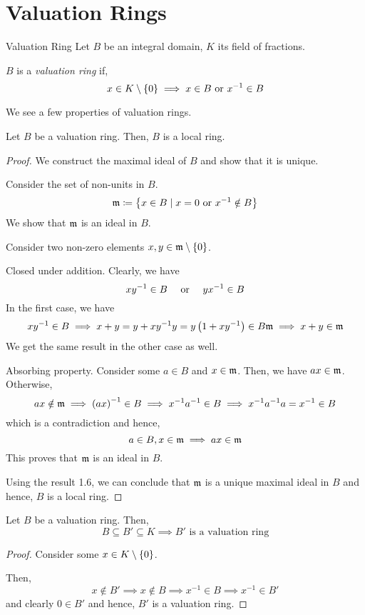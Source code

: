 \pagebreak

\section{Valuation Rings}
\begin{definition}{Valuation Ring}{}
	Let \(B\) be an integral domain, \(K\) its field of fractions.

	\(B\) is a \emph{valuation ring} if,
	\[
		x \in K \setminus \left\{ 0 \right\}
		\implies x \in B \text{ or } x^{-1} \in B
	\]
\end{definition}

We see a few properties of valuation rings.

\begin{proposition}{}{}
\label{prop:5.18.1}
	Let \(B\) be a valuation ring.
	Then, \(B\) is a local ring.
\end{proposition}
\begin{proof}
	We construct the maximal ideal of \(B\) and show that it is unique.

	Consider the set of non-units in \(B\).
	\[
		\mathfrak{m} \coloneqq \left\{ x \in B \mid x = 0 \text{ or } x^{-1} \notin B \right\}
	\]
	We show that \(\mathfrak{m}\) is an ideal in \(B\).

	Consider two non-zero elements \(x, y \in \mathfrak{m} \setminus \left\{ 0 \right\}\).

	Closed under addition.
	Clearly, we have
	\[
		xy^{-1} \in B \quad \text{ or } \quad yx^{-1} \in B
	\]
	In the first case, we have
	\[
		xy^{-1} \in B \implies
		x + y = y + xy^{-1} y = y \left( 1 + xy^{-1} \right) \in B \mathfrak{m}
		\implies x + y \in \mathfrak{m}
	\]
	We get the same result in the other case as well.

	Absorbing property.
	Consider some \(a \in B\) and \(x \in \mathfrak{m}\).
	Then, we have \(ax \in \mathfrak{m}\).
	Otherwise,
	\[
		ax \notin \mathfrak{m} \implies \left( ax \right)^{-1} \in B
		\implies x^{-1} a^{-1} \in B \implies x^{-1} a^{-1} a = x^{-1} \in B
	\]
	which is a contradiction and hence,
	\[
		a \in B, x \in \mathfrak{m} \implies ax \in \mathfrak{m}
	\]
	This proves that \(\mathfrak{m}\) is an ideal in \(B\).

	Using the result 1.6, we can conclude that \(\mathfrak{m}\) is a unique
	maximal ideal in \(B\) and hence, \(B\) is a local ring.
\end{proof}

\begin{proposition}{}{}
\label{prop:5.18.2}
	Let \(B\) be a valuation ring.
	Then,
	\[
		B \subseteq B' \subseteq K
		\implies B' \text{ is a valuation ring}
	\]
\end{proposition}
\begin{proof}
	Consider some \(x \in K \setminus{\ensuremath{\left\{ 0 \right\}}}\).

	Then,
	\[
		x \notin B'
		\implies x \notin B
		\implies x^{-1} \in B
		\implies x^{-1} \in B'
	\]
	and clearly \(0 \in B'\) and hence,
	\(B'\) is a valuation ring.
\end{proof}

